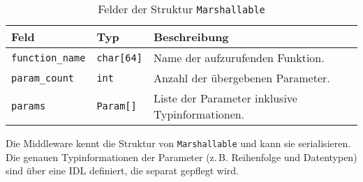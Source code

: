 \begin{table}[h]
	\centering
	\caption{Felder der Struktur \texttt{Marshallable}}
	\begin{tabularx}{\textwidth}{|l|l|X|}
		\hline
		\textbf{Feld} & \textbf{Typ} & \textbf{Beschreibung} \\
		\hline
		\texttt{function\_name} & \texttt{char[64]} & Name der aufzurufenden Funktion. \\
		\hline
		\texttt{param\_count} & \texttt{int} & Anzahl der übergebenen Parameter. \\
		\hline
		\texttt{params} & \texttt{Param[]} & Liste der Parameter inklusive Typinformationen. \\
		\hline
	\end{tabularx}
\end{table}

\noindent
Die Middleware kennt die Struktur von \texttt{Marshallable} und kann sie serialisieren. Die genauen Typinformationen der Parameter (z.\,B. Reihenfolge und Datentypen) sind über eine IDL definiert, die separat gepflegt wird.

